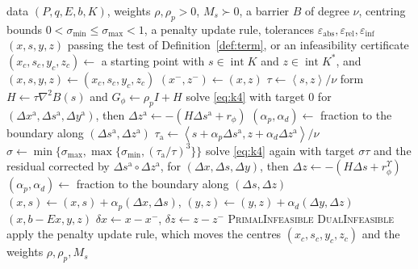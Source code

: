 \documentclass[a4paper,11pt]{book}
\theoremstyle{plain}
\theoremstyle{definition}
\theoremstyle{remark}
\numberwithin{equation}{chapter}
\numberwithin{algorithm}{chapter}
\newcommand{\inner}[2]{\left\langle #1, #2 \right\rangle}
\newcommand{\intr}{\operatorname{int}}
\begin{document}
	\begin{algorithm}[H]
		\caption{Proximal interior point method in the split variables}
		\begin{algorithmic}[1]
			\Require data $(P,q,E,b,K)$, weights $\rho,\rho_p>0$, $M_s\succ0$, a
			barrier $B$ of degree $\nu$, centring bounds
			$0<\sigma_{\min}\leq\sigma_{\max}<1$, a penalty update rule, tolerances
			$\varepsilon_{\mathrm{abs}},\varepsilon_{\mathrm{rel}},
			\varepsilon_{\mathrm{inf}}$
			\Ensure $(x,s,y,z)$ passing the test of Definition~\ref{def:term}, or an
			infeasibility certificate
			\State $(x_c,s_c,y_c,z_c)\gets$ a starting point with
			$s\in\intr K$ and $z\in\intr K^*$, and
			$(x,s,y,z)\gets(x_c,s_c,y_c,z_c)$
			\State $(x^-,z^-)\gets(x,z)$
			\State $\tau\gets\inner{s}{z}/\nu$
			\State form $H\gets\tau\nabla^{2}B(s)$ and
			$G_\phi\gets\rho_pI+H$
			\State solve \eqref{eq:k4} with target $0$ for
			$(\Delta x^{\mathrm a},\Delta s^{\mathrm a},\Delta y^{\mathrm a})$, then
			$\Delta z^{\mathrm a}\gets-(H\Delta s^{\mathrm a}+r_\phi)$
			\State $(\alpha_p,\alpha_d)\gets$ fraction to the boundary along
			$(\Delta s^{\mathrm a},\Delta z^{\mathrm a})$
			\State $\tau_{\mathrm a}\gets
			\inner{s+\alpha_p\Delta s^{\mathrm a}}
			{z+\alpha_d\Delta z^{\mathrm a}}/\nu$
			\State $\sigma\gets\min\bigl\{\sigma_{\max},
			\max\{\sigma_{\min},(\tau_{\mathrm a}/\tau)^3\}\bigr\}$
			\State solve \eqref{eq:k4} again with target $\sigma\tau$ and the
			residual corrected by
			$\Delta s^{\mathrm a}\!\circ\!\Delta z^{\mathrm a}$, for
			$(\Delta x,\Delta s,\Delta y)$, then
			$\Delta z\gets-(H\Delta s+r_\phi^{\Upsilon})$
			\State $(\alpha_p,\alpha_d)\gets$ fraction to the boundary along
			$(\Delta s,\Delta z)$
			\State $(x,s)\gets(x,s)+\alpha_p(\Delta x,\Delta s)$, \quad
			$(y,z)\gets(y,z)+\alpha_d(\Delta y,\Delta z)$
			\State \Return $(x,b-Ex,y,z)$
			\EndIf
			\State $\delta x\gets x-x^-$, \quad $\delta z\gets z-z^-$
			\State \Return \textsc{PrimalInfeasible}
			\EndIf
			\State \Return \textsc{DualInfeasible}
			\EndIf
			\State apply the penalty update rule, which moves the centres
			$(x_c,s_c,y_c,z_c)$ and the weights $\rho,\rho_p,M_s$
			\EndFor
		\end{algorithmic}
	\end{algorithm}
	
\end{document}
